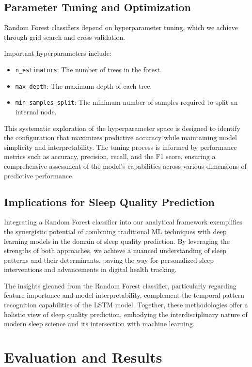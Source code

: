 \documentclass[10pt]{extarticle}
\begin{document}
\subsection{Parameter Tuning and Optimization}
Random Forest classifiers depend on hyperparameter tuning, which we achieve through grid search and cross-validation.

Important hyperparameters include:

\begin{itemize}
    \item \texttt{n\_estimators}: The number of trees in the forest.
    \item \texttt{max\_depth}: The maximum depth of each tree.
    \item \texttt{min\_samples\_split}: The minimum number of samples required to split an internal node.
\end{itemize}

This systematic exploration of the hyperparameter space is designed to identify the configuration that maximizes predictive accuracy while maintaining model simplicity and interpretability. The tuning process is informed by performance metrics such as accuracy, precision, recall, and the F1 score, ensuring a comprehensive assessment of the model's capabilities across various dimensions of predictive performance.

\subsection{Implications for Sleep Quality Prediction}

Integrating a Random Forest classifier into our analytical framework exemplifies the synergistic potential of combining traditional ML techniques with deep learning models in the domain of sleep quality prediction. By leveraging the strengths of both approaches, we achieve a nuanced understanding of sleep patterns and their determinants, paving the way for personalized sleep interventions and advancements in digital health tracking.

The insights gleaned from the Random Forest classifier, particularly regarding feature importance and model interpretability, complement the temporal pattern recognition capabilities of the LSTM model. Together, these methodologies offer a holistic view of sleep quality prediction, embodying the interdisciplinary nature of modern sleep science and its intersection with machine learning.

\section{Evaluation and Results}
\end{document}
